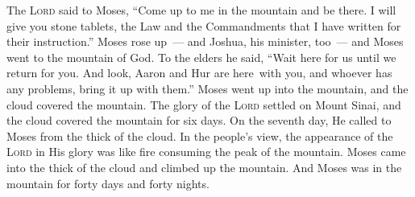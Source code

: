 \begin{inparaenum}
     The \textsc{Lord} said to Moses, ``Come up to me in the mountain and be there. I will give you stone tablets, the Law and the Commandments that I have written for their instruction.''%
     Moses rose up~--- and Joshua, his minister, too~--- and Moses went to the mountain of God.%
     To the elders he said, ``Wait here for us until we return for you. And look, Aaron and Hur are here\understood\ with you, and whoever has any problems, bring it up with them.''%
     Moses went up into the mountain, and the cloud covered the mountain.%
     The glory of the \textsc{Lord} settled on Mount Sinai, and the cloud covered the mountain for six days. On the seventh day, He called to Moses from the thick of the cloud.%
     In the people's view, the appearance of the \textsc{Lord} in His glory was like fire consuming the peak of the mountain.%
     Moses came into the thick of the cloud and climbed up the mountain. And Moses was in the mountain for forty days and forty nights.%
\end{inparaenum}
